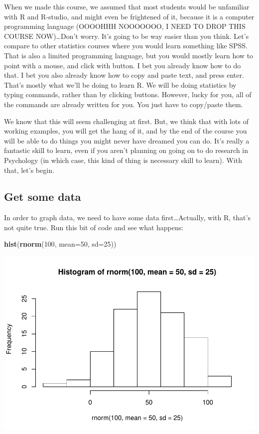 \documentclass[]{book}
\newenvironment{Shaded}{\begin{snugshade}}{\end{snugshade}}
\newcommand{\KeywordTok}[1]{\textcolor[rgb]{0.13,0.29,0.53}{\textbf{#1}}}
\newcommand{\DataTypeTok}[1]{\textcolor[rgb]{0.13,0.29,0.53}{#1}}
\newcommand{\DecValTok}[1]{\textcolor[rgb]{0.00,0.00,0.81}{#1}}
\newcommand{\NormalTok}[1]{#1}
\begin{document}
When we made this course, we assumed that most students would be
unfamiliar with R and R-studio, and might even be frightened of it,
because it is a computer programming language (OOOOHHH NOOOOOOO, I NEED
TO DROP THIS COURSE NOW)\ldots{}Don't worry. It's going to be way easier
than you think. Let's compare to other statistics courses where you
would learn something like SPSS. That is also a limited programming
language, but you would mostly learn how to point with a mouse, and
click with button. I bet you already know how to do that. I bet you also
already know how to copy and paste text, and press enter. That's mostly
what we'll be doing to learn R. We will be doing statistics by typing
commands, rather than by clicking buttons. However, lucky for you, all
of the commands are already written for you. You just have to copy/paste
them.

We know that this will seem challenging at first. But, we think that
with lots of working examples, you will get the hang of it, and by the
end of the course you will be able to do things you might never have
dreamed you can do. It's really a fantastic skill to learn, even if you
aren't planning on going on to do research in Psychology (in which case,
this kind of thing is necessary skill to learn). With that, let's begin.

\subsection{Get some data}\label{get-some-data}

In order to graph data, we need to have some data first\ldots{}Actually,
with R, that's not quite true. Run this bit of code and see what
happens:

\begin{Shaded}
\begin{Highlighting}[]
\KeywordTok{hist}\NormalTok{(}\KeywordTok{rnorm}\NormalTok{(}\DecValTok{100}\NormalTok{, }\DataTypeTok{mean=}\DecValTok{50}\NormalTok{, }\DataTypeTok{sd=}\DecValTok{25}\NormalTok{))}
\end{Highlighting}
\end{Shaded}

\includegraphics{Statistics_Lab_files/figure-latex/unnamed-chunk-2-1.pdf}
\end{document}
